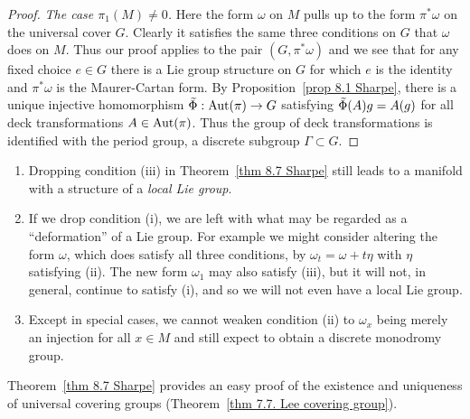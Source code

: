 \begin{proof}
    \emph{The case $\pi_1(M)\neq 0$.} Here the form $\omega$ on $M$ pulls up to the form $\pi^\ast \omega$ on the universal cover $G$. Clearly it satisfies the same three conditions on $G$ that $\omega$ does on $M$. Thus our proof applies to the pair $(G,\pi^\ast\omega)$ and we see that for any fixed choice $e\in G$ there is a Lie group structure on $G$ for which $e$ is the identity and $\pi^\ast\omega$ is the Maurer-Cartan form. By Proposition~\ref{prop 8.1 Sharpe}, there is a unique injective homomorphism $\wt{\Phi}:\Aut(\pi)\to G$ satisfying $\wt{\Phi}(A)g=A(g)$ for all deck transformations $A\in \operatorname{Aut}(\pi)$. Thus the group of deck transformations is identified with the period group, a discrete subgroup $\Gamma\subset G$.
\end{proof}

\begin{rem}
    \begin{enumerate}
        \item Dropping condition (iii) in Theorem~\ref{thm 8.7 Sharpe} still leads to a manifold with a structure of a \emph{local Lie group}.
        \item If we drop condition (i), we are left with what may be regarded as a ``deformation'' of a Lie group. For example we might consider altering the form $\omega$, which does satisfy all three conditions, by $\omega_t=\omega+t\eta$ with $\eta$ satisfying (ii). The new form $\omega_1$ may also satisfy (iii), but it will not, in general, continue to satisfy (i), and so we will not even have a local Lie group.
        \item Except in special cases, we cannot weaken condition (ii) to $\omega_x$ being merely an injection for all $x\in M$ and still expect to obtain a discrete monodromy group.
    \end{enumerate}
\end{rem}

Theorem~\ref{thm 8.7 Sharpe} provides an easy proof of the existence and uniqueness of universal covering groups (Theorem~\ref{thm 7.7. Lee covering group}).

